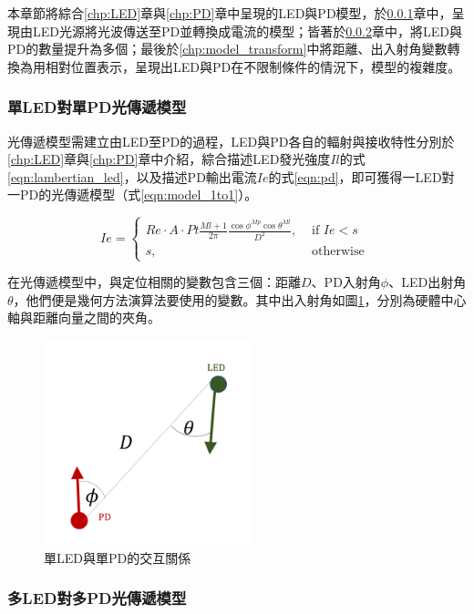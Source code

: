     本章節將綜合\ref{chp:LED}章與\ref{chp:PD}章中呈現的LED與PD模型，於\ref{chp:model_1to1}章中，呈現由LED光源將光波傳送至PD並轉換成電流的模型；皆著於\ref{chp:model_mul}章中，將LED與PD的數量提升為多個；最後於\ref{chp:model_transform}中將距離、出入射角變數轉換為用相對位置表示，呈現出LED與PD在不限制條件的情況下，模型的複雜度。
    
    \subsubsection{單LED對單PD光傳遞模型}
    \label{chp:model_1to1}

    光傳遞模型需建立由LED至PD的過程，LED與PD各自的輻射與接收特性分別於\ref{chp:LED}章與\ref{chp:PD}章中介紹，綜合描述LED發光強度$Il$的式\ref{eqn:lambertian_led}，以及描述PD輸出電流$Ie$的式\ref{eqn:pd}，即可獲得一LED對一PD的光傳遞模型（式\ref{eqn:model_1to1}）。

    \begin{equation}
        \label{eqn:model_1to1}
        Ie = \begin{cases}Re \cdot A\cdot Pt\frac{Ml+1}{2\pi}\frac{\cos \phi^{Mp}\cos \theta^{Ml}}{D^2}, & \text { if } Ie<s \\ s, & \text { otherwise }\end{cases}
    \end{equation}

    在光傳遞模型中，與定位相關的變數包含三個：距離$D$、PD入射角$\phi$、LED出射角$\theta$，他們便是幾何方法演算法要使用的變數。其中出入射角如圖\ref{pic:interactive_1to1}，分別為硬體中心軸與距離向量之間的夾角。

    \begin{figure}[ht]
        \centering
        \includegraphics[width=6cm]{ch2pic/interactive_1to1.png}
        \caption{單LED與單PD的交互關係}
        \label{pic:interactive_1to1}
    \end{figure}

    \subsubsection{多LED對多PD光傳遞模型}
    \label{chp:model_mul}

